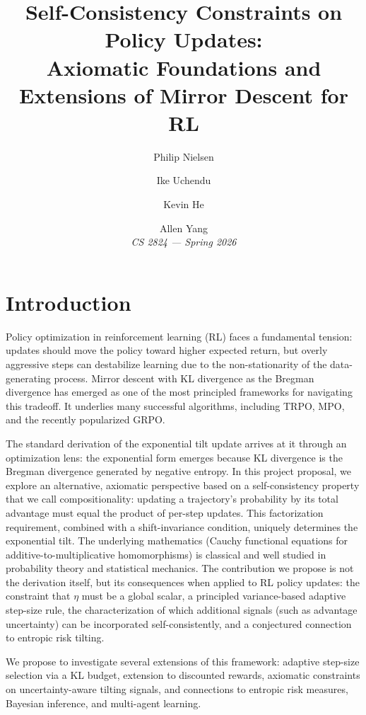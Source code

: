 \documentclass[11pt]{article}
\title{\textbf{Self-Consistency Constraints on Policy Updates:\\Axiomatic Foundations and Extensions of Mirror Descent for RL}}
\author{Philip Nielsen \and Ike Uchendu \and Kevin He \and Allen Yang\\[4pt]
\textit{CS 2824 --- Spring 2026}}
\date{}
\theoremstyle{definition}
\theoremstyle{remark}
\begin{document}
\maketitle

\section{Introduction}

Policy optimization in reinforcement learning (RL) faces a fundamental tension: updates should move the policy toward higher expected return, but overly aggressive steps can destabilize learning due to the non-stationarity of the data-generating process. Mirror descent with KL divergence as the Bregman divergence has emerged as one of the most principled frameworks for navigating this tradeoff. It underlies many successful algorithms, including TRPO, MPO, and the recently popularized GRPO.

The standard derivation of the exponential tilt update arrives at it through an optimization lens: the exponential form emerges because KL divergence is the Bregman divergence generated by negative entropy. In this project proposal, we explore an alternative, axiomatic perspective based on a self-consistency property that we call compositionality: updating a trajectory's probability by its total advantage must equal the product of per-step updates. This factorization requirement, combined with a shift-invariance condition, uniquely determines the exponential tilt. The underlying mathematics (Cauchy functional equations for additive-to-multiplicative homomorphisms) is classical and well studied in probability theory and statistical mechanics. The contribution we propose is not the derivation itself, but its consequences when applied to RL policy updates: the constraint that $\eta$ must be a global scalar, a principled variance-based adaptive step-size rule, the characterization of which additional signals (such as advantage uncertainty) can be incorporated self-consistently, and a conjectured connection to entropic risk tilting.

We propose to investigate several extensions of this framework: adaptive step-size selection via a KL budget, extension to discounted rewards, axiomatic constraints on uncertainty-aware tilting signals, and connections to entropic risk measures, Bayesian inference, and multi-agent learning.
\end{document}
